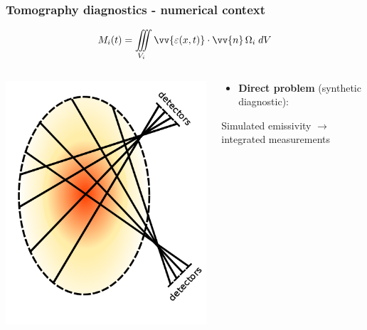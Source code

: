 \documentclass[10pt]{beamer}
\begin{document}
\begin{frame}
\frametitle{Tomography diagnostics - numerical context}
    \vspace{-0.75cm}

    $$M_i(t) = \iiint\limits_{V_i} \vv{\varepsilon(x,t)}\cdot\vv{n} \,\Omega_i \;{d}V$$
    \vspace{-0.75cm}
\begin{columns}
    	\begin{column}{0.325\textwidth}
    	
    	\includegraphics[width=\linewidth]{figures/detectors2.png}

    	\end{column}

   	\begin{column}{0.675\textwidth}
   	\begin{center}
   	
   	\begin{block}{}
	\begin{itemize}
	\item \textcolor{myblue}{\textbf{Direct problem} (synthetic diagnostic):\\
	}
	\end{itemize}
	\end{block}
Simulated emissivity $\longrightarrow$ integrated measurements\\


\end{center}
\end{column}
\end{columns}
\end{frame}
\end{document}
